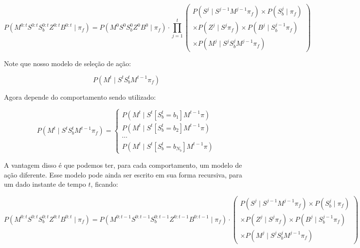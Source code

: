 \begin{equation}
        P \left( M^{0: t} S^{0: t} S_b^{0: t} Z^{0: t} B^{0: t} \mid \pi_f \right) = P \left( M^0 S^0 S_b^0 Z^0 B^0 \mid \pi_f \right) \cdot \prod\limits_{j =1}^{t} 
        \left(
            \begin{array}{l}
                P \left( S^j \mid S^{j -1} M^{j -1} \pi_f \right) \times P \left( S_b^j \mid \pi_f \right) \\
                \times P \left( Z^j \mid S^j \pi_f \right) \times P \left( B^j \mid S_b^{j-1} \pi_f \right) \\
                \times P \left( M^j \mid S^j S_b^j M^{j -1} \pi_f \right)
            \end{array}
        \right)
\end{equation}


Note que nosso modelo de seleção de ação:

\begin{equation}
	P \left( M^t \mid S^t S_b^t M^{t-1} \pi_f \right)
\end{equation}

Agora depende do comportamento sendo utilizado:

\begin{equation}
    P \left( M^t \mid S^t S_b^t M^{t-1} \pi_f \right) = 
        \left\{
            \begin{array}{l}
                P \left( M^t \mid S^t \left[ S_b^t=b_1 \right] M^{t-1} \pi \right) \\
                P \left( M^t \mid S^t \left[ S_b^t=b_2 \right] M^{t-1} \pi \right) \\
                \cdots \\
                P \left( M^t \mid S^t \left[ S_b^t=b_{N_b} \right] M^{t-1} \pi \right)
            \end{array}
        \right.
\end{equation}

A vantagem disso é que podemos ter, para cada comportamento, um modelo de ação diferente. Esse modelo pode ainda ser escrito em sua forma recursiva, para um dado instante de tempo $ t $, ficando:

\begin{equation}
        P \left( M^{0: t} S^{0: t} S_b^{0: t} Z^{0: t} B^{0: t} \mid \pi_f \right) = P \left( M^{0: t-1} S^{0: t-1} S_b^{0: t-1} Z^{0: t-1} B^{0: t-1} \mid \pi_f \right) \cdot 
        \left(
            \begin{array}{l}
                P \left( S^j \mid S^{j -1} M^{j -1} \pi_f \right) \times P \left( S_b^j \mid \pi_f \right) \\
                \times P \left( Z^j \mid S^j \pi_f \right) \times P \left( B^j \mid S_b^{j-1} \pi_f \right) \\
                \times P \left( M^j \mid S^j S_b^j M^{j -1} \pi_f \right)
            \end{array}
        \right)
\end{equation}

